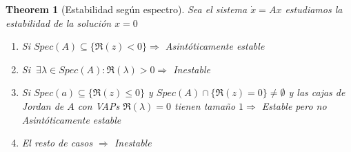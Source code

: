 \documentclass[leqno]{article}
\newtheorem*{theorem}{Theorem}
\begin{document}
\begin{theorem}[Estabilidad según espectro] Sea el sistema $\dot{x}=Ax$ estudiamos la estabilidad de la solución $x=0$
  \begin{enumerate}[topsep=-6pt, itemsep=0pt] 
    \item Si $Spec(A)\subseteq \{\Re(z)<0\} \Rightarrow $ Asintóticamente estable
    \item Si $\ \exists \lambda\in Spec(A): \Re(\lambda)>0 \Rightarrow $ Inestable
	\item Si $Spec(a)\subseteq \{\Re (z)\le 0\}$ y $Spec(A)\cap \{\Re(z)=0\}\neq \emptyset$ y las cajas de Jordan de $A$ con VAPs $\Re(\lambda)=0$ tienen tamaño $1 \Rightarrow $ Estable pero no Asintóticamente estable
	\item El resto de casos $\Rightarrow$ Inestable
  \end{enumerate}
\end{theorem}
\end{document}
